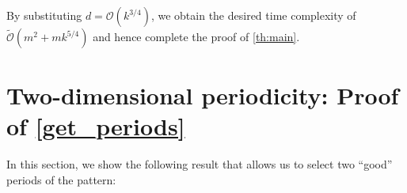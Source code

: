 \documentclass[11pt, letterpaper]{article}
\theoremstyle{plain}
\newtheorem{lemma}{Lemma}
\theoremstyle{definition}
\theoremstyle{remark}
\renewcommand{\O}{\mathcal{O}}
\newcommand{\tO}{\tilde{\mathcal{O}}}
\begin{document}
By substituting $d = \O(k^{3/4})$, we obtain the desired time complexity of $\tO(m^2 + mk^{5/4})$ and hence complete the proof of \cref{th:main}.

\section{Two-dimensional periodicity: Proof of \cref{get_periods}}
In this section, we show the following result that allows us to select two ``good'' periods of the pattern:

\end{document}
